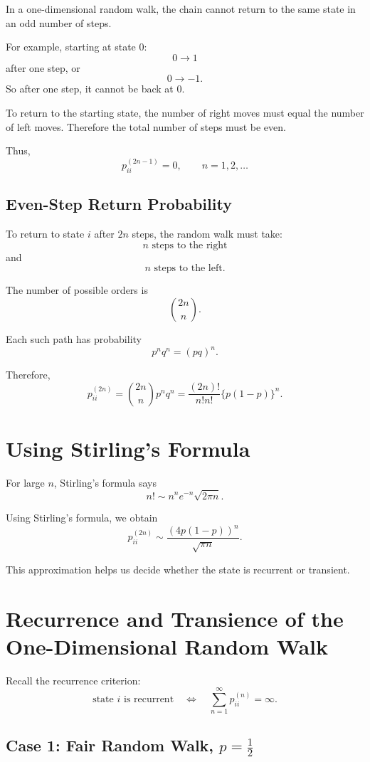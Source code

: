 \documentclass[12pt,a4paper]{article}
\theoremstyle{lecturestyle}
\begin{document}
In a one-dimensional random walk, the chain cannot return to the same state in an odd number of steps.

For example, starting at state $0$:
\[
0\to 1
\]
after one step, or
\[
0\to -1.
\]
So after one step, it cannot be back at $0$.

To return to the starting state, the number of right moves must equal the number of left moves. Therefore the total number of steps must be even.

Thus,
\[
p_{ii}^{(2n-1)}=0,
\qquad n=1,2,\ldots
\]

\subsection{Even-Step Return Probability}

To return to state $i$ after $2n$ steps, the random walk must take:
\[
n\text{ steps to the right}
\]
and
\[
n\text{ steps to the left}.
\]

The number of possible orders is
\[
\binom{2n}{n}.
\]

Each such path has probability
\[
p^nq^n=(pq)^n.
\]

Therefore,
\[
p_{ii}^{(2n)}
=
\binom{2n}{n}p^nq^n
=
\frac{(2n)!}{n!n!}\{p(1-p)\}^n.
\]

\section{Using Stirling's Formula}

For large $n$, Stirling's formula says
\[
n!\sim n^n e^{-n}\sqrt{2\pi n}.
\]

Using Stirling's formula, we obtain
\[
p_{ii}^{(2n)}
\sim
\frac{(4p(1-p))^n}{\sqrt{\pi n}}.
\]

This approximation helps us decide whether the state is recurrent or transient.

\section{Recurrence and Transience of the One-Dimensional Random Walk}

Recall the recurrence criterion:
\[
\text{state }i\text{ is recurrent}
\quad\Longleftrightarrow\quad
\sum_{n=1}^{\infty}p_{ii}^{(n)}=\infty.
\]

\subsection{Case 1: Fair Random Walk, $p=\frac12$}
\end{document}
